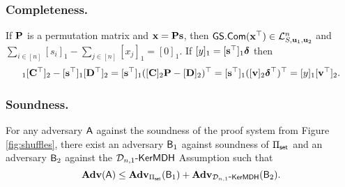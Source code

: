 \subsubsection{Completeness.} If $\mathbf{{P}}$ is a permutation matrix and $\mathbf{x}=\mathbf{{P}}\mathbf{s}$, then ${\mathsf{GS}}.\mathsf{Com}(\mathbf{x}^\top)\in\mathcal{L}_{S,\mathbf{u}_1,\mathbf{u}_2}^n$ and $\sum_{i\in[n]}[s_i]_1-\sum_{j\in[n]}[{x}_j]_1=[0]_1$. If $[y]_1=[\mathbf{s}^\top]_1{\boldsymbol \delta}$ then
\begin{eqnarray*}
    [\vecb{x}^\top]_1[\matr{C}^\top]_2-
    [\vecb{s}^\top]_1[\matr{D}^\top]_2
 = 
    [\vecb{s}^\top]_1([\matr{C}]_2\matr{P}-[\matr{D}]_2)^\top
 = 
    [\vecb{s}^\top]_1([\vecb{v}]_2\grkb{\delta}^\top)^\top
 =
    [y]_1[\vecb{v}^\top]_2.
\end{eqnarray*}

\subsubsection{Soundness.}
\begin{theorem}
For any adversary $\mathsf{A}$ against the soundness of the proof system from Figure \ref{fig:shuffles}, there exist an adversary $\mathsf{B}_1$ against soundness of $\Pi_{\mathsf{set}}$ and an adversary $\mathsf{B}_2$ against the $\mathcal{D}_{n,1}\mbox{-}\mathsf{KerMDH}$ Assumption such that
$$\mathbf{Adv}(\mathsf{A}) \leq \mathbf{Adv}_{\Pi_{\mathsf{set}}}(\mathsf{B}_1) + \mathbf{Adv}_{\mathcal{D}_{n,1}\mbox{-}\mathsf{KerMDH}}(\mathsf{B}_2).
$$
\end{theorem}

